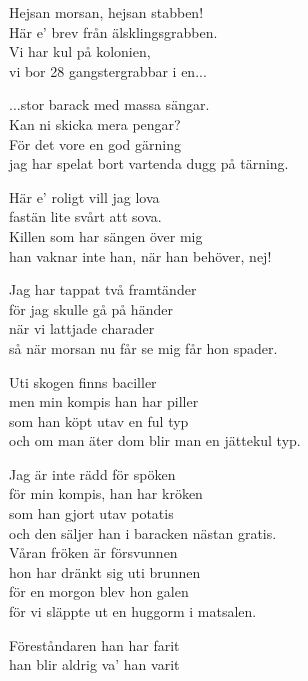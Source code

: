 \vspace{10pt}
Hejsan morsan, hejsan stabben!\\
Här e' brev från älsklingsgrabben.\\
Vi har kul på kolonien,\\
vi bor 28 gangstergrabbar i en...\par
\vspace{10pt}
...stor barack med massa sängar.\\
Kan ni skicka mera pengar?\\
För det vore en god gärning\\
jag har spelat bort vartenda dugg på tärning.\par
\vspace{10pt}
Här e' roligt vill jag lova\\
fastän lite svårt att sova.\\
Killen som har sängen över mig\\
han vaknar inte han, när han behöver, nej!\par
\vspace{10pt}
Jag har tappat två framtänder\\
för jag skulle gå på händer\\
när vi lattjade charader\\
så när morsan nu får se mig får hon spader.\par
\vspace{10pt}
Uti skogen finns baciller\\
men min kompis han har piller\\
som han köpt utav en ful typ\\
och om man äter dom blir man en jättekul typ.\par
\newpage
Jag är inte rädd för spöken\\
för min kompis, han har kröken\\
som han gjort utav potatis\\
och den säljer han i baracken nästan gratis.\\
Våran fröken är försvunnen\\
hon har dränkt sig uti brunnen\\
för en morgon blev hon galen\\
för vi släppte ut en huggorm i matsalen.\par
\vspace{10pt}
Föreståndaren han har farit\\
han blir aldrig va' han varit\\
